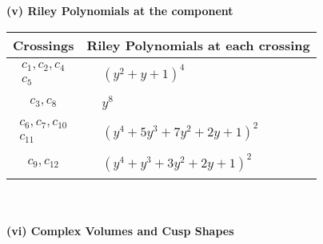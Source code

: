 \documentclass[1p]{elsarticle_modified}
\theoremstyle{definition}
\begin{document}
\newpage\renewcommand{\arraystretch}{1}
\flushleft \textbf{(v) Riley Polynomials at the component}\newline \\
\begin{tabular}{m{50pt}|m{274pt}}
Crossings & \hspace{64pt}Riley Polynomials at each crossing \\
\hline $$\begin{aligned}c_{1},c_{2},c_{4}\\c_{5}\end{aligned}$$&$\begin{aligned}
&(y^2+y+1)^4
\end{aligned}$\\
\hline $$\begin{aligned}c_{3},c_{8}\end{aligned}$$&$\begin{aligned}
&y^8
\end{aligned}$\\
\hline $$\begin{aligned}c_{6},c_{7},c_{10}\\c_{11}\end{aligned}$$&$\begin{aligned}
&(y^4+5 y^3+7 y^2+2 y+1)^2
\end{aligned}$\\
\hline $$\begin{aligned}c_{9},c_{12}\end{aligned}$$&$\begin{aligned}
&(y^4+y^3+3 y^2+2 y+1)^2
\end{aligned}$\\
\hline
\end{tabular}\\~\\
\newpage\flushleft \textbf{(vi) Complex Volumes and Cusp Shapes}
\end{document}
